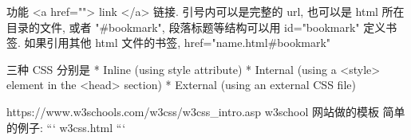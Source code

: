 
\begin{issues}
\issueDraft
\end{issues}

功能
<a href=""> link </a> 链接. 引号内可以是完整的 url, 也可以是 html 所在目录的文件, 或者 "#bookmark", 段落标题等结构可以用 id="bookmark" 定义书签. 如果引用其他 html 文件的书签, href="name.html#bookmark"

三种 CSS 分别是 
* Inline (using style attribute)
* Internal (using a <style> element in the <head> section)
* External (using an external CSS file)

https://www.w3schools.com/w3css/w3css_intro.asp
w3school 网站做的模板
简单的例子:
```
w3css.html
```